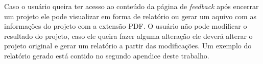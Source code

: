 Caso o usuário queira ter acesso ao conteúdo da página de \textit{feedback} após encerrar um projeto ele pode visualizar em forma de relatório ou gerar um aquivo com as informações do projeto com a extensão PDF. O usuário não pode modificar o resultado do projeto, caso ele queira fazer alguma alteração ele deverá alterar o projeto original e gerar um relatório a partir das modificações. Um exemplo do relatório gerado está contido no segundo apendice deste trabalho.


